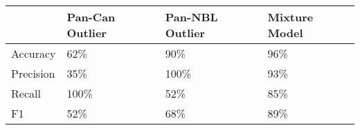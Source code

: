 \documentclass{standalone}
\begin{document}
\begin{tabular}{llll}
\toprule
{} & Pan-Can Outlier & Pan-NBL Outlier & Mixture Model \\
\midrule
Accuracy  &             62\% &             90\% &           96\% \\
Precision &             35\% &            100\% &           93\% \\
Recall    &            100\% &             52\% &           85\% \\
F1        &             52\% &             68\% &           89\% \\
\bottomrule
\end{tabular}
\end{document}
